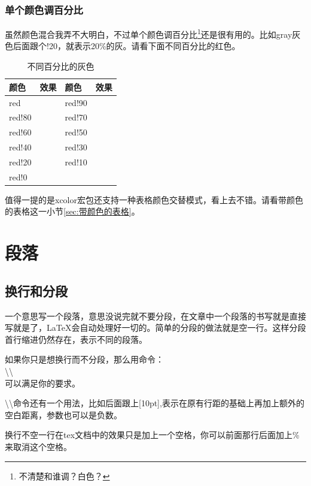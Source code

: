 \documentclass[11pt,oneside]{book}
\begin{document}
\subsection{单个颜色调百分比}
虽然颜色混合我弄不大明白，不过单个颜色调百分比\footnote{不清楚和谁调？白色？}还是很有用的。比如gray灰色后面跟个!20，就表示20\%的灰。请看下面不同百分比的红色。
\begin{table}[H]
\centering
\begin{tabular}{@{}lp{50pt}lp{50pt}@{}}
\toprule
颜色        & 效果  & 颜色       & 效果\\ \midrule
red     &  \cellcolor{red}  & red!90     &    \cellcolor{red!90} \\
red!80      &   \cellcolor{red!80} & red!70    &   \cellcolor{red!70}\\
red!60     &  \cellcolor{red!60}  & red!50      &   \cellcolor{red!50}\\
red!40      &   \cellcolor{red!40} & red!30    &   \cellcolor{red!30}\\
red!20  &  \cellcolor{red!20} &red!10       &   \cellcolor{red!10}  \\
red!0    &    \cellcolor{red!0}\\ \bottomrule
\end{tabular}
\label{tab:不同百分比的灰色}
\caption{不同百分比的灰色}
\end{table}


值得一提的是xcolor宏包还支持一种表格颜色交替模式，看上去不错。请看带颜色的表格这一小节\ref{sec:带颜色的表格}。



\chapter{段落}
\section{换行和分段}
一个意思写一个段落，意思没说完就不要分段，在文章中一个段落的书写就是直接写就是了，\LaTeX 会自动处理好一切的。简单的分段的做法就是空一行。这样分段首行缩进仍然存在，表示不同的段落。

如果你只是想换行而不分段，那么用命令：\\
\textbackslash \textbackslash \\
可以满足你的要求。

\textbackslash \textbackslash 命令还有一个用法，比如后面跟上[10pt],表示在原有行距的基础上再加上额外的空白距离，参数也可以是负数。

换行不空一行在tex文档中的效果只是加上一个空格，你可以前面那行后面加上\%{}来取消这个空格。
\end{document}
